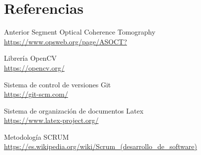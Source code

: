 \documentclass[12pt]{article}
\begin{document}
\newpage
\clearpage
\section{Referencias}
\begin{thebibliography}{9}
	Anterior Segment Optical Coherence Tomography \\ 
	\url{https://www.opsweb.org/page/ASOCT?} 
	
	Librería OpenCV \\
	\url{https://opencv.org/}
	
	Sistema de control de versiones Git \\
	\url{https://git-scm.com/}
	
	Sistema de organización de documentos Latex\\
	\url{https://www.latex-project.org/}
	
	Metodología SCRUM\\
	\url{https://es.wikipedia.org/wiki/Scrum_(desarrollo_de_software)}
\end{thebibliography}

\newpage
\paragraph{}
\end{document}
